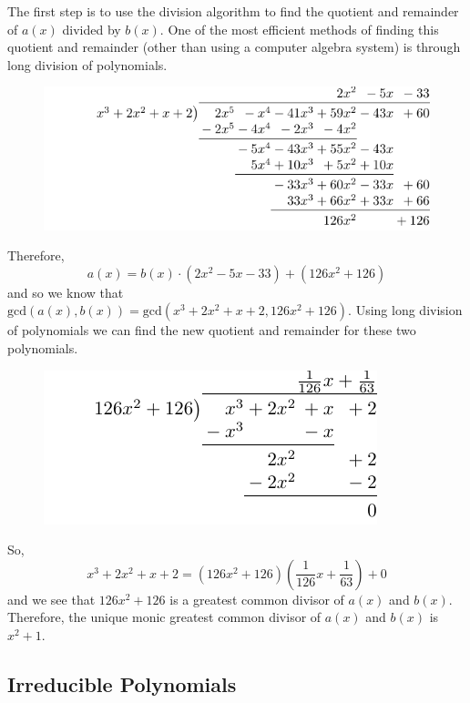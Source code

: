 \documentclass[
]{book}
\theoremstyle{definition}
\theoremstyle{definition}
\theoremstyle{definition}
\theoremstyle{definition}
\theoremstyle{remark}
\begin{document}
The first step is to use the division algorithm to find the quotient and remainder of \(a(x)\) divided by \(b(x)\). One of the most efficient methods of finding this quotient and remainder (other than using a computer algebra system) is through long division of polynomials.

\begin{figure}

{\centering \includegraphics[width=0.75\linewidth]{tikz/polynomial-division} 

}

\end{figure}

Therefore,
\[a(x)=b(x) \cdot (2x^2-5x-33) + (126x^2 + 126)\] and so we know that \(\mathrm{gcd}(a(x),b(x))= \mathrm{gcd}(x^3+2x^2+x+2, 126x^2+126)\). Using long division of polynomials we can find the new quotient and remainder for these two polynomials.

\begin{figure}

{\centering \includegraphics[width=0.5\linewidth]{tikz/polynomial-division2} 

}

\end{figure}

So, \[x^3+2x^2+x+2 = (126x^2+126)\left(\frac{1}{126}x+\frac{1}{63}\right)+ 0\] and we see that \(126x^2+126\) is a greatest common divisor of \(a(x)\) and \(b(x)\). Therefore, the unique monic greatest common divisor of \(a(x)\) and \(b(x)\) is \(x^2+1\).

\hypertarget{irreducible-polynomials}{%
\subsection{Irreducible Polynomials}\label{irreducible-polynomials}}
\end{document}
